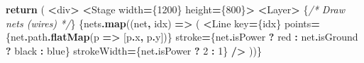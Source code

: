 \documentclass[
]{article}
\newenvironment{Shaded}{\begin{snugshade}}{\end{snugshade}}
\newcommand{\AttributeTok}[1]{\textcolor[rgb]{0.13,0.29,0.53}{#1}}
\newcommand{\CommentTok}[1]{\textcolor[rgb]{0.56,0.35,0.01}{\textit{#1}}}
\newcommand{\ControlFlowTok}[1]{\textcolor[rgb]{0.13,0.29,0.53}{\textbf{#1}}}
\newcommand{\DecValTok}[1]{\textcolor[rgb]{0.00,0.00,0.81}{#1}}
\newcommand{\FunctionTok}[1]{\textcolor[rgb]{0.13,0.29,0.53}{\textbf{#1}}}
\newcommand{\KeywordTok}[1]{\textcolor[rgb]{0.13,0.29,0.53}{\textbf{#1}}}
\newcommand{\NormalTok}[1]{#1}
\newcommand{\OperatorTok}[1]{\textcolor[rgb]{0.81,0.36,0.00}{\textbf{#1}}}
\newcommand{\StringTok}[1]{\textcolor[rgb]{0.31,0.60,0.02}{#1}}
\begin{document}
\begin{Shaded}
\begin{Highlighting}[]
  \ControlFlowTok{return}\NormalTok{ (}
    \OperatorTok{\textless{}}\NormalTok{div}\OperatorTok{\textgreater{}}
      \OperatorTok{\textless{}}\NormalTok{Stage width}\OperatorTok{=}\NormalTok{\{}\DecValTok{1200}\NormalTok{\} height}\OperatorTok{=}\NormalTok{\{}\DecValTok{800}\NormalTok{\}}\OperatorTok{\textgreater{}}
        \OperatorTok{\textless{}}\NormalTok{Layer}\OperatorTok{\textgreater{}}
\NormalTok{          \{}\CommentTok{/* Draw nets (wires) */}\NormalTok{\}}
\NormalTok{          \{nets}\OperatorTok{.}\FunctionTok{map}\NormalTok{((net}\OperatorTok{,}\NormalTok{ idx) }\KeywordTok{=\textgreater{}}\NormalTok{ (}
            \OperatorTok{\textless{}}\NormalTok{Line}
\NormalTok{              key}\OperatorTok{=}\NormalTok{\{idx\}}
\NormalTok{              points}\OperatorTok{=}\NormalTok{\{net}\OperatorTok{.}\AttributeTok{path}\OperatorTok{.}\FunctionTok{flatMap}\NormalTok{(p }\KeywordTok{=\textgreater{}}\NormalTok{ [p}\OperatorTok{.}\AttributeTok{x}\OperatorTok{,}\NormalTok{ p}\OperatorTok{.}\AttributeTok{y}\NormalTok{])\}}
\NormalTok{              stroke}\OperatorTok{=}\NormalTok{\{net}\OperatorTok{.}\AttributeTok{isPower} \OperatorTok{?} \StringTok{\textquotesingle{}red\textquotesingle{}} \OperatorTok{:}\NormalTok{ net}\OperatorTok{.}\AttributeTok{isGround} \OperatorTok{?} \StringTok{\textquotesingle{}black\textquotesingle{}} \OperatorTok{:} \StringTok{\textquotesingle{}blue\textquotesingle{}}\NormalTok{\}}
\NormalTok{              strokeWidth}\OperatorTok{=}\NormalTok{\{net}\OperatorTok{.}\AttributeTok{isPower} \OperatorTok{?} \DecValTok{2} \OperatorTok{:} \DecValTok{1}\NormalTok{\}}
            \OperatorTok{/\textgreater{}}
\NormalTok{          ))\}}


\end{Highlighting}
\end{Shaded}
\end{document}
